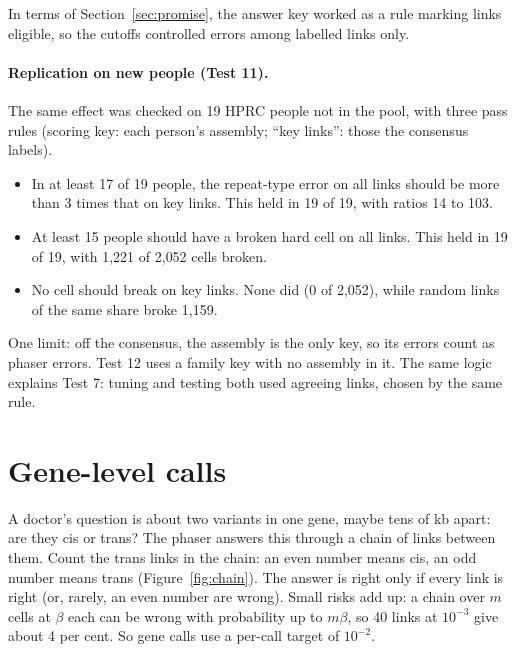 \documentclass[11pt]{article}
\begin{document}
In terms of Section~\ref{sec:promise}, the answer key worked as a rule
marking links eligible, so the cutoffs controlled errors among labelled
links only.

\paragraph{Replication on new people (Test 11).} The same effect was
checked on 19 HPRC people not in the pool, with three pass rules (scoring
key: each person's assembly; \enquote{key links}: those the consensus labels).

\begin{itemize}
\item In at least 17 of 19 people, the repeat-type error on all links should
  be more than 3 times that on key links. This held in 19 of 19, with ratios
  14 to 103.
\item At least 15 people should have a broken hard cell on all links. This
  held in 19 of 19, with 1{,}221 of 2{,}052 cells broken.
\item No cell should break on key links. None did (0 of 2{,}052), while
  random links of the same share broke 1{,}159.
\end{itemize}

One limit: off the consensus, the assembly is the only key, so its errors
count as phaser errors. Test 12 uses a family key with no assembly in it.
The same logic explains Test 7: tuning and testing both used agreeing links,
chosen by the same rule.

\section{Gene-level calls}\label{sec:genes}

A doctor's question is about two variants in one gene, maybe tens of
kb apart: are they cis or trans? The phaser answers this through a chain of
links between them. Count the trans links in the chain: an even number means
cis, an odd number means trans (Figure~\ref{fig:chain}). The answer is right
only if every link is right (or, rarely, an even number are wrong). Small
risks add up: a chain over $m$ cells at $\beta$ each can be wrong with
probability up to $m\beta$, so 40 links at $10^{-3}$ give about 4 per cent.
So gene calls use a per-call target of $10^{-2}$.
\end{document}
